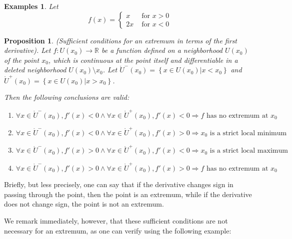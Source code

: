 \documentclass[a4paper,12pt]{article} %
\newtheorem{proposition}{Proposition}[section]
\newtheorem{example}{Examples}
\begin{document}
\begin{example}
    \normalfont
    Let 
    \[
        f(x) = \left\{\begin{array}{cl} x & \text{ for } x > 0\\
                                 2x & \text{ for } x < 0
        \end{array}\right.
        \]
\end{example}

\begin{proposition}{\rm (Sufficient conditions for an extremum in terms of the 
    first derivative).}
    \normalfont 
    Let $f: U(x_0) \to \mathbb{R}$ be a function defined on a neighborhood $U(x_0)$
    of the point $x_0$, which is continuous at the point itself and differentiable 
    in a deleted neighborhood $U(x_0)\setminus x_0$. Let $\mathring{U}^-(x_0)
    = \left\{x \in U(x_0)\vert x < x_0\right\}$ and $\mathring{U}^+(x_0) = \left\{x \in U(x_0) \vert x > x_0\right\}$.

    Then the following conclusions are valid:
    \begin{enumerate}[label=(\alph*)]
        \item $\forall x \in \mathring{U}^-(x_0),f'(x) < 0 \wedge \forall x \in \mathring{U}^+(x_0),
            f'(x) < 0 \Rightarrow f \text{ has no extremum at } x_0 $
        \item $\forall x \in \mathring{U}^-(x_0),f'(x) < 0 \wedge \forall x \in \mathring{U}^+(x_0),
            f'(x) > 0 \Rightarrow x_0 \text{ is a strict local minimum }  $
        \item $\forall x \in \mathring{U}^-(x_0),f'(x) > 0 \wedge \forall x \in \mathring{U}^+(x_0),
            f'(x) < 0 \Rightarrow x_0 \text{ is a strict local maximum }$
        \item $\forall x \in \mathring{U}^-(x_0),f'(x) > 0 \wedge \forall x \in \mathring{U}^+(x_0),
            f'(x) > 0 \Rightarrow f \text{ has no extremum at } x_0 $
    \end{enumerate}
\end{proposition}

Briefly, but less precisely, one can say that if the derivative changes sign 
in passing through the point, then the point is an extremum, while if the 
derivative does not change sign, the point is not an extremum.

We remark immediately, however, that these sufficient conditions are not 
necessary for an extremum, as one can verify using the following example:
\end{document}
